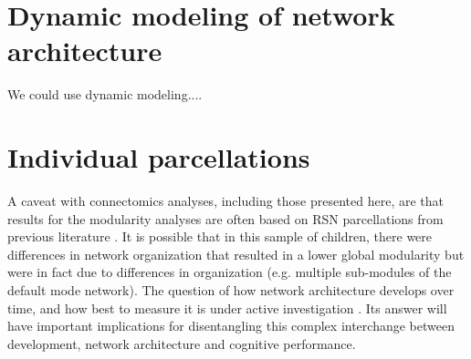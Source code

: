 \section{Dynamic modeling of network architecture}

We could use dynamic modeling....

\section{Individual parcellations}

A caveat with connectomics analyses, including those presented here, are that results for the modularity analyses are often based on RSN parcellations from previous literature \citep{Power2011}. It is possible that in this sample of children, there were differences in network organization that resulted in a lower global modularity but were in fact due to differences in organization (e.g. multiple sub-modules of the default mode network). The question of how network architecture develops over time, and how best to measure it is under active investigation \citep{Cao2016}. Its answer will have important implications for disentangling this complex interchange between development, network architecture and cognitive performance.

